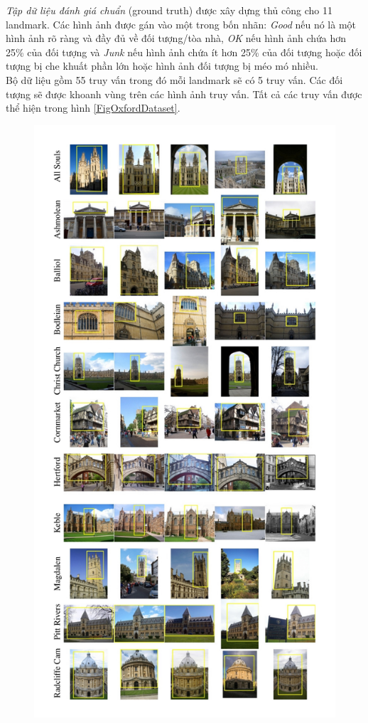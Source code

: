 \textit{Tập dữ liệu đánh giá chuẩn} (ground truth) được xây dựng thủ công cho 11 landmark. Các hình ảnh được gán vào một trong bốn nhãn: \textit{Good} nếu nó là một hình ảnh rõ ràng và đầy đủ về đối tượng/tòa nhà, \textit{OK} nếu hình ảnh chứa hơn 25\% của đối tượng và \textit{Junk} nếu hình ảnh chứa ít hơn 25\% của đối tượng hoặc đối tượng bị che khuất phần lớn hoặc hình ảnh đối tượng bị méo mó nhiều.\\
Bộ dữ liệu gồm 55 truy vấn trong đó mỗi landmark sẽ có 5 truy vấn. Các đối tượng sẽ được khoanh vùng trên các hình ảnh truy vấn. Tất cả các truy vấn được thể hiện trong hình \ref{FigOxfordDataset}.

\begin{figure}[!htbp]
  \begin{center}
    \leavevmode
    \ifpdf
      \includegraphics[scale=0.27]{oxfordDataset}

\end{center}
\end{figure}
